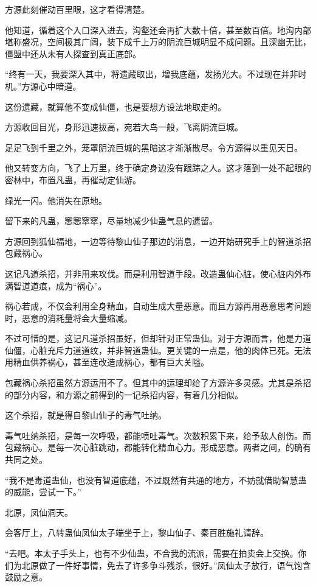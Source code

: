 \begin{this_body}
方源此刻催动百里眼，这才看得清楚。

他知道，循着这个入口深入进去，沟壑还会再扩大数十倍，甚至数百倍。地沟内部堪称盛况，空间极其广阔，装下成千上万的阴流巨城明显不成问题。且深幽无比，僵盟中还从未有人探查到真正底部。

“终有一天，我要深入其中，将遗藏取出，增我底蕴，发扬光大。不过现在并非时机。”方源心中暗道。

这份遗藏，就算他不变成仙僵，也是要想方设法地取走的。

方源收回目光，身形迅速拔高，宛若大鸟一般，飞离阴流巨城。

足足飞到千里之外，笼罩阴流巨城的黑暗这才渐渐散尽。令方源得以重见天日。

他又转变方向，飞了上万里，终于确定身边没有跟踪之人。这才落到一处不起眼的密林中，布置凡蛊，再催动定仙游。

绿光一闪。他消失在原地。

留下来的凡蛊，窸窸窣窣，尽量地减少仙蛊气息的遗留。

方源回到狐仙福地，一边等待黎山仙子那边的消息，一边开始研究手上的智道杀招包藏祸心。

这记凡道杀招，并非用来攻伐。而是利用智道手段。改造蛊仙心脏，使心脏内外布满智道道痕，成为“祸心”。

祸心若成，不仅会利用全身精血，自动生成大量恶意。而且方源再用恶意思考问题时，恶意的消耗量将会大量缩减。

不过可惜的是，这记凡道杀招虽好，但却针对正常蛊仙。对于方源而言，他是力道仙僵，心脏充斥力道道纹，并非智道蛊仙。更关键的一点是，他的肉体已死。无法用精血供养祸心，甚至连改造成祸心，都有巨大关隘。

包藏祸心杀招虽然方源运用不了。但其中的运理却给了方源许多灵感。尤其是杀招的部分内容，和方源之前得到的一记杀招内容，有着几分相似。

这个杀招，就是得自黎山仙子的毒气吐纳。

毒气吐纳杀招，是每一次呼吸，都能喷吐毒气。次数积累下来，给予敌人创伤。而包藏祸心。是每一次心脏跳动，都能转化精血心力。形成恶意。两者之间，的确有共同之处。

“我不是毒道蛊仙，也没有智道底蕴，不过既然有共通的地方，不妨就借助智慧蛊的威能，尝试一下。”

北原，凤仙洞天。

会客厅上，八转蛊仙凤仙太子端坐于上，黎山仙子、秦百胜施礼请辞。

“去吧。本太子手头上，也有不少仙蛊，不合我的流派，需要在拍卖会上交换。你们为北原做了一件好事情，免去了许多争斗残杀，很好。”凤仙太子放行，语气饱含鼓励之意。


\end{this_body}
